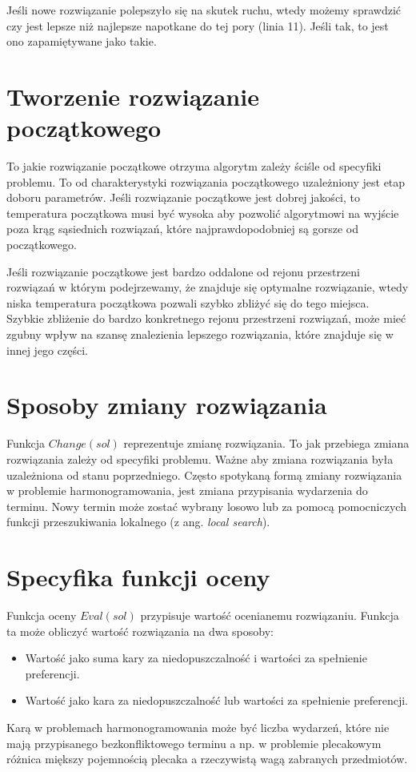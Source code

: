 Jeśli nowe rozwiązanie polepszyło się na skutek ruchu, wtedy możemy sprawdzić
czy jest lepsze niż najlepsze napotkane do tej pory (linia 11). Jeśli tak, to
jest ono zapamiętywane jako takie.

\section{Tworzenie rozwiązanie początkowego}
To jakie rozwiązanie początkowe otrzyma algorytm zależy ściśle od specyfiki
problemu. To od charakterystyki rozwiązania początkowego uzależniony jest etap
doboru parametrów. Jeśli rozwiązanie początkowe jest dobrej jakości, to
temperatura początkowa musi być wysoka aby pozwolić algorytmowi na wyjście poza
krąg sąsiednich rozwiązań, które najprawdopodobniej są gorsze od początkowego.

Jeśli rozwiązanie początkowe jest bardzo oddalone od rejonu przestrzeni
rozwiązań w którym podejrzewamy, że znajduje się optymalne rozwiązanie, wtedy
niska temperatura początkowa pozwali szybko zbliżyć się do tego miejsca. Szybkie
zbliżenie do bardzo konkretnego rejonu przestrzeni rozwiązań, może mieć zgubny
wpływ na szansę znalezienia lepszego rozwiązania, które znajduje się w innej
jego części.

\section{Sposoby zmiany rozwiązania}
Funkcja $Change(sol)$ reprezentuje zmianę rozwiązania. To jak przebiega zmiana
rozwiązania zależy od specyfiki problemu. Ważne aby zmiana rozwiązania była uzależniona
od stanu poprzedniego.
Często spotykaną formą zmiany rozwiązania w problemie harmonogramowania, jest
zmiana przypisania wydarzenia do terminu. Nowy termin może zostać wybrany losowo
lub za pomocą pomocniczych funkcji przeszukiwania lokalnego (z ang.
\emph{local search}).
\newpage
\section{Specyfika funkcji oceny}
Funkcja oceny $Eval(sol)$ przypisuje wartość ocenianemu rozwiązaniu. Funkcja ta
może obliczyć wartość rozwiązania na dwa sposoby:
\begin{itemize}
	\item Wartość jako suma kary za niedopuszczalność i wartości za
		spełnienie preferencji.
	\item Wartość jako kara za niedopuszczalność lub wartości za
		spełnienie preferencji.
\end{itemize}
Karą w problemach harmonogramowania może być liczba wydarzeń, które nie mają
przypisanego bezkonfliktowego terminu a np. w problemie plecakowym różnica miększy
pojemnością plecaka a rzeczywistą wagą zabranych przedmiotów.

